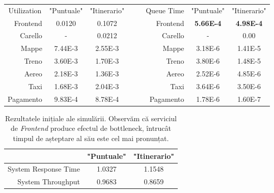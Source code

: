 \documentclass[12pt]{article}
\begin{document}
            \begin{table}[!h]
                \centering
                \begin{tabular}{r|cclrr|cc}
                    \multicolumn{1}{c|}{Utilization} & "Puntuale" & "Itinerario" &  & \multicolumn{1}{c}{} & \multicolumn{1}{c|}{Queue Time} & "Puntuale"       & "Itinerario"     \\ \cline{1-3} \cline{6-8} 
                    Frontend                         & 0.0120     & 0.1072       &  &                      & Frontend                        & \textbf{5.66E-4} & \textbf{4.98E-4} \\
                    Carello                          & -          & 0.0212       &  &                      & Carello                         & -                & 0.00             \\
                    Mappe                            & 7.44E-3    & 2.55E-3      &  &                      & Mappe                           & 3.18E-6          & 1.41E-5          \\
                    Treno                            & 3.60E-3    & 1.70E-3      &  &                      & Treno                           & 3.80E-6          & 1.48E-5          \\
                    Aereo                            & 2.18E-3    & 1.36E-3      &  &                      & Aereo                           & 2.52E-6          & 4.85E-6          \\
                    Taxi                             & 1.68E-3    & 2.04E-3      &  &                      & Taxi                            & 3.64E-6          & 3.50E-6          \\
                    Pagamento                        & 9.83E-4    & 8.78E-4      &  &                      & Pagamento                       & 1.78E-6          & 1.60E-7         
                \end{tabular}
            \end{table}

            \begin{table}[!h]
                \centering
                \begin{tabular}{r|cc}
                    \multicolumn{1}{c|}{} & "Puntuale" & "Itinerario" \\ \hline
                    System Response Time  & 1.0327     & 1.1548       \\
                    System Throughput     & 0.9683     & 0.8659      
                \end{tabular}
                \caption{Rezultatele inițiale ale simulării. Observăm că serviciul de \textit{Frontend} produce efectul de bottleneck, întrucât timpul de așteptare al său este cel mai pronunțat.}
            \end{table}
            \pagebreak
\end{document}

